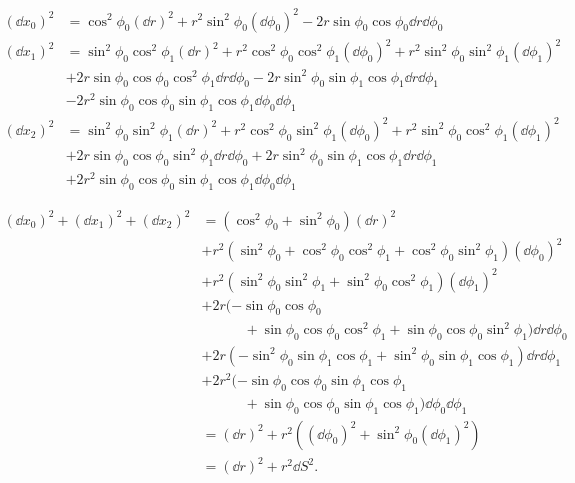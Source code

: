 	\begin{align*}
	(\dd x_0)^2 &= \cos^2 \phi_0 (\dd r)^2 + r^2\sin^2\phi_0 (\dd\phi_0)^2 -2r\sin\phi_0\cos\phi_0 \dd r \dd \phi_0 \\
	(\dd x_1)^2 &= \sin^2 \phi_0 \cos^2 \phi_1 (\dd r)^2 + r^2\cos^2 \phi_0 \cos^2 \phi_1 (\dd\phi_0)^2 + r^2\sin^2 \phi_0 \sin^2 \phi_1 (\dd \phi_1)^2 \\
		&+ 2r\sin \phi_0 \cos \phi_0 \cos^2 \phi_1 \dd r \dd\phi_0 - 2r \sin^2 \phi_0 \sin \phi_1 \cos \phi_1 \dd r \dd \phi_1 \\
		&- 2r^2\sin \phi_0\cos \phi_0 \sin \phi_1 \cos \phi_1 \dd\phi_0 \dd \phi_1 \\
	(\dd x_2)^2 &= \sin^2 \phi_0 \sin^2 \phi_1 (\dd r)^2 + r^2\cos^2 \phi_0 \sin^2 \phi_1 (\dd \phi_0)^2 + r^2\sin^2 \phi_0 \cos^2 \phi_1 (\dd \phi_1)^2 \\
	&+ 2r \sin \phi_0 \cos \phi_0 \sin^2 \phi_1 \dd r \dd \phi_0 + 2r \sin^2 \phi_0 \sin \phi_1 \cos \phi_1 \dd r \dd \phi_1 \\
	&+ 2r^2 \sin \phi_0 \cos \phi_0 \sin \phi_1 \cos \phi_1 \dd \phi_0 \dd \phi_1
	\end{align*}

	\begin{align*}
	(\dd x_0)^2 + (\dd x_1)^2 + (\dd x_2)^2 &= (\cos^2 \phi_0 + \sin^2 \phi_0) (\dd r)^2 \\
		&+ r^2(\sin^2\phi_0 + \cos^2 \phi_0 \cos^2 \phi_1 + \cos^2 \phi_0 \sin^2 \phi_1) (\dd\phi_0)^2 \\
		&+ r^2(\sin^2 \phi_0 \sin^2 \phi_1 + \sin^2 \phi_0 \cos^2 \phi_1) (\dd \phi_1)^2 \\
		&+ 2r(-\sin\phi_0\cos\phi_0 \\
		&\hspace{3em}+ \sin \phi_0 \cos \phi_0 \cos^2 \phi_1 + \sin \phi_0 \cos \phi_0 \sin^2 \phi_1)  \dd r \dd \phi_0 \\
		&+ 2r(- \sin^2 \phi_0 \sin \phi_1 \cos \phi_1 + \sin^2 \phi_0 \sin \phi_1 \cos \phi_1) \dd r \dd \phi_1 \\
		&+ 2r^2(- \sin \phi_0\cos \phi_0 \sin \phi_1 \cos \phi_1 \\
		&\hspace{3em} + \sin \phi_0 \cos \phi_0 \sin \phi_1 \cos \phi_1) \dd\phi_0 \dd \phi_1 \\
		&= (\dd r)^2 + r^2 ( (\dd\phi_0)^2 + \sin^2 \phi_0 (\dd \phi_1)^2 ) \\
		&= (\dd r)^2 + r^2 \dd S^2 .
	\end{align*}